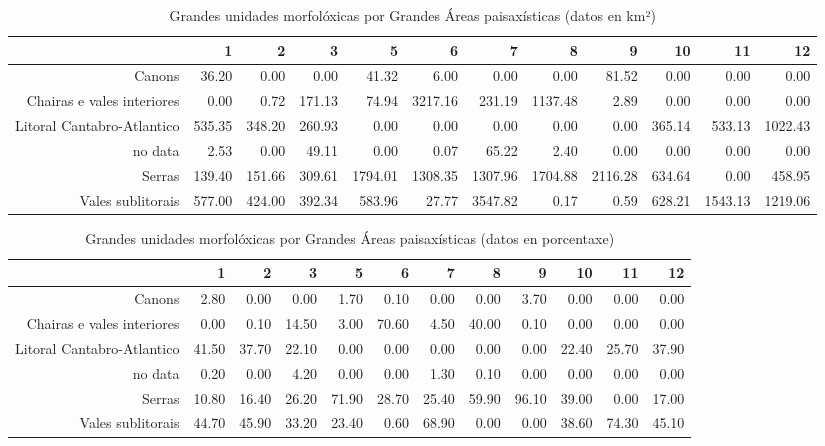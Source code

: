 \begin{table}[p]
\centering
\caption{Grandes unidades morfolóxicas por Grandes Áreas paisaxísticas (datos en km²)} 
\label{xtaboa1}
\begin{tabular}{rrrrrrrrrrrr}
  \hline
 & 1 & 2 & 3 & 5 & 6 & 7 & 8 & 9 & 10 & 11 & 12 \\ 
  \hline
Canons & 36.20 & 0.00 & 0.00 & 41.32 & 6.00 & 0.00 & 0.00 & 81.52 & 0.00 & 0.00 & 0.00 \\ 
  Chairas e vales interiores & 0.00 & 0.72 & 171.13 & 74.94 & 3217.16 & 231.19 & 1137.48 & 2.89 & 0.00 & 0.00 & 0.00 \\ 
  Litoral Cantabro-Atlantico & 535.35 & 348.20 & 260.93 & 0.00 & 0.00 & 0.00 & 0.00 & 0.00 & 365.14 & 533.13 & 1022.43 \\ 
  no data & 2.53 & 0.00 & 49.11 & 0.00 & 0.07 & 65.22 & 2.40 & 0.00 & 0.00 & 0.00 & 0.00 \\ 
  Serras & 139.40 & 151.66 & 309.61 & 1794.01 & 1308.35 & 1307.96 & 1704.88 & 2116.28 & 634.64 & 0.00 & 458.95 \\ 
  Vales sublitorais & 577.00 & 424.00 & 392.34 & 583.96 & 27.77 & 3547.82 & 0.17 & 0.59 & 628.21 & 1543.13 & 1219.06 \\ 
   \hline
\end{tabular}
\end{table}
\begin{table}[p]
\centering
\caption{Grandes unidades morfolóxicas por Grandes Áreas paisaxísticas (datos en porcentaxe)} 
\label{xtaboa1p}
\begin{tabular}{rrrrrrrrrrrr}
  \hline
 & 1 & 2 & 3 & 5 & 6 & 7 & 8 & 9 & 10 & 11 & 12 \\ 
  \hline
Canons & 2.80 & 0.00 & 0.00 & 1.70 & 0.10 & 0.00 & 0.00 & 3.70 & 0.00 & 0.00 & 0.00 \\ 
  Chairas e vales interiores & 0.00 & 0.10 & 14.50 & 3.00 & 70.60 & 4.50 & 40.00 & 0.10 & 0.00 & 0.00 & 0.00 \\ 
  Litoral Cantabro-Atlantico & 41.50 & 37.70 & 22.10 & 0.00 & 0.00 & 0.00 & 0.00 & 0.00 & 22.40 & 25.70 & 37.90 \\ 
  no data & 0.20 & 0.00 & 4.20 & 0.00 & 0.00 & 1.30 & 0.10 & 0.00 & 0.00 & 0.00 & 0.00 \\ 
  Serras & 10.80 & 16.40 & 26.20 & 71.90 & 28.70 & 25.40 & 59.90 & 96.10 & 39.00 & 0.00 & 17.00 \\ 
  Vales sublitorais & 44.70 & 45.90 & 33.20 & 23.40 & 0.60 & 68.90 & 0.00 & 0.00 & 38.60 & 74.30 & 45.10 \\ 
   \hline
\end{tabular}
\end{table}
